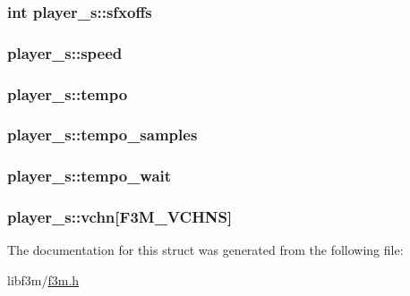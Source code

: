 \subsubsection[{sfxoffs}]{\setlength{\rightskip}{0pt plus 5cm}int player\+\_\+s\+::sfxoffs}\label{structplayer__s_a653f0f7aa7453b01d0b637f59d1b4e21}
\hypertarget{structplayer__s_a41b1ead3a9ed4ff1ab0f7de7f959ab43}{}
\subsubsection[{speed}]{ player\+\_\+s\+::speed}\label{structplayer__s_a41b1ead3a9ed4ff1ab0f7de7f959ab43}
\hypertarget{structplayer__s_aa8118e22c2625d08681e4b6279a84122}{}
\subsubsection[{tempo}]{ player\+\_\+s\+::tempo}\label{structplayer__s_aa8118e22c2625d08681e4b6279a84122}
\hypertarget{structplayer__s_af8d88f5d106f29fd826b5614e9ef8f60}{}
\subsubsection[{tempo\+\_\+samples}]{ player\+\_\+s\+::tempo\+\_\+samples}\label{structplayer__s_af8d88f5d106f29fd826b5614e9ef8f60}
\hypertarget{structplayer__s_af8184b71d6f7d93d37f1100cb0eb8727}{}
\subsubsection[{tempo\+\_\+wait}]{ player\+\_\+s\+::tempo\+\_\+wait}\label{structplayer__s_af8184b71d6f7d93d37f1100cb0eb8727}
\hypertarget{structplayer__s_a080fb2e562e73d54c01e416fe8d4910a}{}
\subsubsection[{vchn}]{ player\+\_\+s\+::vchn\mbox{[}{\bf F3\+M\+\_\+\+V\+C\+H\+N\+S}\mbox{]}}\label{structplayer__s_a080fb2e562e73d54c01e416fe8d4910a}


The documentation for this struct was generated from the following file\+:\begin{DoxyCompactItemize}
\item 
libf3m/\hyperlink{f3m_8h}{f3m.\+h}\end{DoxyCompactItemize}
